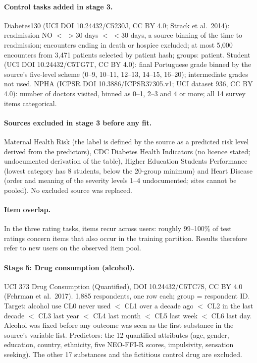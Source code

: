 \documentclass[10pt]{article}
\begin{document}
\paragraph{Control tasks added in stage 3.} Diabetes130 (UCI DOI 10.24432/C5230J, CC BY 4.0; Strack et al.\ 2014): readmission NO $<$ $>$30 days $<$ $<$30 days, a source binning of the time to readmission; encounters ending in death or hospice excluded; at most 5,000 encounters from 3,471 patients selected by patient hash; groups: patient. Student (UCI DOI 10.24432/C5TG7T, CC BY 4.0): final Portuguese grade binned by the source's five-level scheme (0--9, 10--11, 12--13, 14--15, 16--20); intermediate grades not used. NPHA (ICPSR DOI 10.3886/ICPSR37305.v1; UCI dataset 936, CC BY 4.0): number of doctors visited, binned as 0--1, 2--3 and 4 or more; all 14 survey items categorical.

\paragraph{Sources excluded in stage 3 before any fit.} Maternal Health Risk (the label is defined by the source as a predicted risk level derived from the predictors), CDC Diabetes Health Indicators (no licence stated; undocumented derivation of the table), Higher Education Students Performance (lowest category has 8 students, below the 20-group minimum) and Heart Disease (order and meaning of the severity levels 1--4 undocumented; sites cannot be pooled). No excluded source was replaced.

\paragraph{Item overlap.} In the three rating tasks, items recur across users: roughly 99--100\% of test ratings concern items that also occur in the training partition. Results therefore refer to new users on the observed item pool.

\paragraph{Stage 5: Drug consumption (alcohol).} UCI 373 Drug Consumption (Quantified), DOI 10.24432/C5TC7S, CC BY 4.0 (Fehrman et al.\ 2017). 1,885 respondents, one row each; group = respondent ID. Target: alcohol use CL0 never used $<$ CL1 over a decade ago $<$ CL2 in the last decade $<$ CL3 last year $<$ CL4 last month $<$ CL5 last week $<$ CL6 last day. Alcohol was fixed before any outcome was seen as the first substance in the source's variable list. Predictors: the 12 quantified attributes (age, gender, education, country, ethnicity, five NEO-FFI-R scores, impulsivity, sensation seeking). The other 17 substances and the fictitious control drug are excluded.
\end{document}
